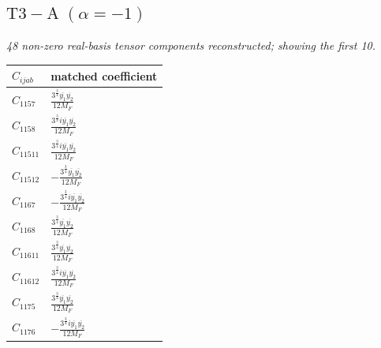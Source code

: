 \documentclass[9pt]{article}
\begin{document}
\subsection*{$ \mathrm{T3-A}\;(\alpha=-1) $}
\textit{48 non-zero real-basis tensor components reconstructed; showing the first 10.}
\begin{longtable}{@{}ll@{}}
\toprule
$C_{ijab}$ & matched coefficient \\
\midrule
$C_{1157}$ & $ \frac{3^{\frac{3}{4}} \overline{y_{1}} \overline{y_{2}}}{12 M_F} $ \\
$C_{1158}$ & $ \frac{3^{\frac{3}{4}} i \overline{y_{1}} \overline{y_{2}}}{12 M_F} $ \\
$C_{11511}$ & $ \frac{3^{\frac{3}{4}} i \overline{y_{1}} \overline{y_{2}}}{12 M_F} $ \\
$C_{11512}$ & $ - \frac{3^{\frac{3}{4}} \overline{y_{1}} \overline{y_{2}}}{12 M_F} $ \\
$C_{1167}$ & $ - \frac{3^{\frac{3}{4}} i \overline{y_{1}} \overline{y_{2}}}{12 M_F} $ \\
$C_{1168}$ & $ \frac{3^{\frac{3}{4}} \overline{y_{1}} \overline{y_{2}}}{12 M_F} $ \\
$C_{11611}$ & $ \frac{3^{\frac{3}{4}} \overline{y_{1}} \overline{y_{2}}}{12 M_F} $ \\
$C_{11612}$ & $ \frac{3^{\frac{3}{4}} i \overline{y_{1}} \overline{y_{2}}}{12 M_F} $ \\
$C_{1175}$ & $ \frac{3^{\frac{3}{4}} \overline{y_{1}} \overline{y_{2}}}{12 M_F} $ \\
$C_{1176}$ & $ - \frac{3^{\frac{3}{4}} i \overline{y_{1}} \overline{y_{2}}}{12 M_F} $ \\
\bottomrule
\end{longtable}
\end{document}
